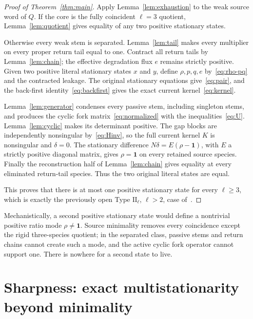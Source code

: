 \documentclass[11pt,reqno]{amsart}
\theoremstyle{plain}
\theoremstyle{definition}
\theoremstyle{remark}
\numberwithin{equation}{section}
\newcommand{\one}{\mathbf{1}}
\begin{document}
\begin{proof}[Proof of Theorem~\ref{thm:main}]
Apply Lemma~\ref{lem:exhaustion} to the weak source word of $Q$.  If the core is the fully coincident $\ell=3$ quotient, Lemma~\ref{lem:quotient} gives equality of any two positive stationary states.

Otherwise every weak stem is separated.  Lemma~\ref{lem:tail} makes every multiplier on every proper return tail equal to one.  Contract all return tails by Lemma~\ref{lem:chain}; the effective degradation flux $e$ remains strictly positive.  Given two positive literal stationary states $x$ and $y$, define $\rho,p,q,e$ by~\eqref{eq:rho-pq} and the contracted leakage.  The original stationary equations give~\eqref{eq:pair}, and the back-first identity~\eqref{eq:backfirst} gives the exact current kernel~\eqref{eq:kernel}.

Lemma~\ref{lem:generator} condenses every passive stem, including singleton stems, and produces the cyclic fork matrix~\eqref{eq:normalized} with the inequalities~\eqref{eq:U}.  Lemma~\ref{lem:cyclic} makes its determinant positive.  The gap blocks are independently nonsingular by~\eqref{eq:Hinv}, so the full current kernel $K$ is nonsingular and $\delta=0$.  The stationary difference $N\delta=E(\rho-\one)$, with $E$ a strictly positive diagonal matrix, gives $\rho=\one$ on every retained source species.  Finally the reconstruction half of Lemma~\ref{lem:chain} gives equality at every eliminated return-tail species.  Thus the two original literal states are equal.

This proves that there is at most one positive stationary state for every $\ell\ge3$, which is exactly the previously open Type $\mathrm{II}_\ell$, $\ell>2$, case of~\cite[Theorem~5.2]{NNU26}.
\end{proof}

Mechanistically, a second positive stationary state would define a nontrivial positive ratio mode $\rho\ne\one$.  Source minimality removes every coincidence except the rigid three-species quotient; in the separated class, passive stems and return chains cannot create such a mode, and the active cyclic fork operator cannot support one.  There is nowhere for a second state to live.

\section{Sharpness: exact multistationarity beyond minimality}\label{sec:counterexamples}
\end{document}
